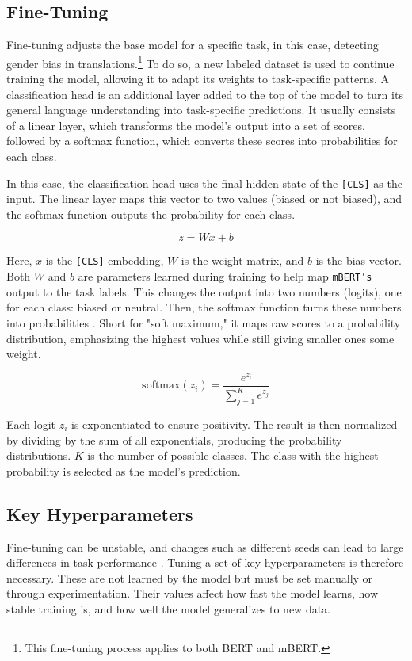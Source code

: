 \subsection{Fine-Tuning}
    Fine-tuning adjusts the base model for a specific task, in this case, detecting gender bias in translations.\footnote{This fine-tuning process applies to both BERT and mBERT.} To do so, a new labeled dataset is used to continue training the model, allowing it to adapt its weights to task-specific patterns. A classification head is an additional layer added to the top of the model to turn its general language understanding into task-specific predictions. It usually consists of a linear layer, which transforms the model’s output into a set of scores, followed by a softmax function, which converts these scores into probabilities for each class.

    In this case, the classification head uses the final hidden state of the \texttt{[CLS]} as the input. The linear layer maps this vector to two values (biased or not biased), and the softmax function outputs the probability for each class.

    \[
    z = Wx + b
    \]

    Here, \(x\) is the \texttt{[CLS]} embedding, \(W\) is the weight matrix, and \(b\) is the bias vector. Both \(W\) and \(b\) are parameters learned during training to help map \texttt{mBERT’s} output to the task labels. This changes the output into two numbers (logits), one for each class: biased or neutral. Then, the softmax function turns these numbers into probabilities \parencite{devlinBERTPretrainingDeep2019,xiaoIntroductionTransformersNLP2023}. Short for "soft maximum," it maps raw scores to a probability distribution, emphasizing the highest values while still giving smaller ones some weight.

    \[
    \text{softmax}(z_i) = \frac{e^{z_i}}{\sum_{j=1}^{K} e^{z_j}}
    \]

    Each logit \( z_i \) is exponentiated to ensure positivity. The result is then normalized by dividing by the sum of all exponentials, producing the probability distributions. \( K \) is the number of possible classes. The class with the highest probability is selected as the model’s prediction.
    
\subsection{Key Hyperparameters} \label{subsection:hyperparameters_explained}
    Fine-tuning can be unstable, and changes such as different seeds can lead to large differences in task performance \parencite{mosbachStabilityFinetuningBERT2021}. Tuning a set of key hyperparameters is therefore necessary. These are not learned by the model but must be set manually or through experimentation. Their values affect how fast the model learns, how stable training is, and how well the model generalizes to new data.

